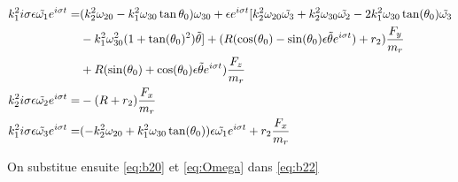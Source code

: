 \begin{align}
    k_1^2 i \sigma\epsilon \Tilde{\omega_1} e^{i \sigma t} =&(k_2^2\omega_{20}-k_1^2\omega_{30} \tan{\theta_0})\omega_{30}+\epsilon e^{i\sigma t}[k_2^2 \omega_{20} \tilde{\omega_3}+k_2^2 \omega_{30} \tilde{\omega_2} -2k_1^2\omega_{30} \tan(\theta_0)\tilde{\omega_3} \nonumber\\
    &-k_1^2 \omega_{30}^2(1+\tan(\theta_0)^2)\tilde{\theta} ]+(R(\cos(\theta_0)- \sin(\theta_0)\epsilon \Tilde{\theta} e^{i \sigma t})+r_2)\frac{F_y}{m_r}\nonumber \\
    &+ R(\sin(\theta_0)+ \cos(\theta_0)\epsilon \Tilde{\theta} e^{i \sigma t})\frac{F_z}{m_r} \nonumber\\ 
    k_2^2 i \sigma\epsilon \Tilde{\omega_2} e^{i \sigma t}=&-(R+r_2) \frac{F_x}{m_r} \nonumber\\ 
    k_1^2 i \sigma\epsilon \Tilde{\omega_3} e^{i \sigma t}=&(-k_2^2\omega_{20}+k_1^2\omega_{30} \tan(\theta_0))\epsilon \Tilde{\omega_1} e^{i \sigma t} + r_2 \frac{F_x}{m_r}
  \label{eq:b22}
\end{align}

On substitue ensuite \ref{eq:b20} et \ref{eq:Omega} dans \ref{eq:b22} 

